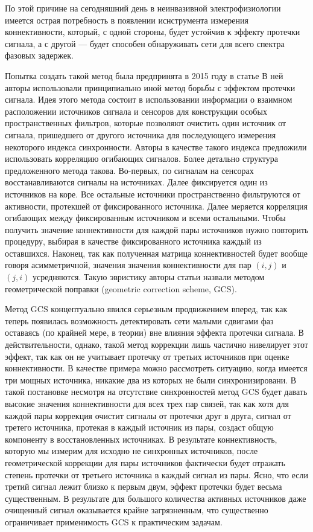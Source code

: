 По этой причине на сегодняшний день в неинвазивной электрофизиологии имеется острая
потребность в появлении иснструмента измерения коннективности, который, с одной стороны,
будет устойчив к эффекту протечки сигнала, а с другой --- будет способен обнаруживать сети
для всего спектра фазовых задержек.


Попытка создать такой метод была предпринята в 2015 году в статье
В ней авторы использовали принципиально иной метод борьбы с эффектом протечки сигнала.
Идея этого метода состоит в использовании информации
о взаимном расположении источников сигнала и сенсоров для конструкции особых пространственных
фильтров, которые позволяют очистить один источник
от сигнала, пришедшего от другого источника для последующего измерения
некоторого индекса синхронности. Авторы в качестве такого индекса предложили использовать корреляцию огибающих сигналов. Более детально структура
предложенного метода такова. Во-первых, по сигналам на сенсорах восстанавливаются сигналы на источниках.
Далее фиксируется один из источников на коре.
Все остальные источники пространственно фильтруются от активности, протекшей от фиксированного источника.
Далее меряется корреляция огибающих между фиксированным источником и всеми остальными.
Чтобы получить значение коннективности для каждой пары источников нужно повторить процедуру, выбирая
в качестве фиксированного источника каждый из оставшихся.
Наконец, так как полученная матрица коннективностей будет вообще говоря асимметричной, значения
значения коннективности для пар $(i,j)$ и $(j,i)$ усредняются. Такую эвристику авторы статьи назвали
методом геометрической поправки (geometric correction scheme, GCS).

Метод GCS концептуально явился серьезным продвижением вперед, так как теперь
появилась возможность детектировать сети малыми сдвигами фаз оставаясь (по
крайней мере, в теории) вне влияния эффекта протечки сигнала.  В
действительности, однако, такой метод коррекции лишь частично нивелирует этот
эффект, так как он не учитывает протечку от третьих источников при оценке
коннективности. В качестве примера можно рассмотреть ситуацию, когда имеется
три мощных источника, никакие два из которых не были синхронизировани.  В такой
постановке несмотря на отсутствие синхронностей метод GCS будет давать высокие
значения коннективности для всех трех пар связей, так как хотя для каждой пары
коррекция очистит сигналы от протечки друг в друга, сигнал от третего
источника, протекая в каждый источник из пары, создаст общую компоненту в
восстановленных источниках.  В результате коннективность, которую мы измерим
для исходно не синхронных источников, после геометрической коррекции для пары
источников фактически будет отражать степень протечки от третьего источника в
каждый сигнал из пары. Ясно, что если третий сигнал лежит близко к первым двум,
эффект протечки будет весьма существенным. В результате для большого количества
активных источников даже очищенный сигнал оказывается крайне загрязненным, что
существенно ограничивает применимость GCS к практическим задачам.



